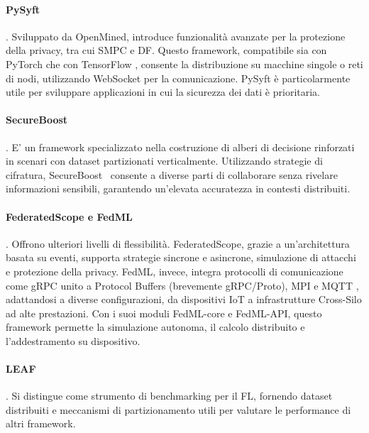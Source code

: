 \documentclass[a4paper, oneside, openright]{report}
\begin{document}
\paragraph{PySyft} \cite{pysyft}. Sviluppato da OpenMined, introduce funzionalità avanzate per la protezione della privacy, tra cui SMPC e DF. Questo framework, compatibile sia con PyTorch \cite{pytorch} che con TensorFlow \cite{tf}, consente la distribuzione su macchine singole o reti di nodi, utilizzando WebSocket per la comunicazione. PySyft è particolarmente utile per sviluppare applicazioni in cui la sicurezza dei dati è prioritaria.

\paragraph{SecureBoost} \cite{secure-boost}. E' un framework specializzato nella costruzione di alberi di decisione rinforzati in scenari con dataset partizionati verticalmente. Utilizzando strategie di cifratura, SecureBoost~\cite{secure-boost} consente a diverse parti di collaborare senza rivelare informazioni sensibili, garantendo un'elevata accuratezza in contesti distribuiti.


\paragraph{FederatedScope e FedML} \cite{federated-scope} \cite{fedml}. Offrono ulteriori livelli di flessibilità. FederatedScope, grazie a un'architettura basata su eventi, supporta strategie sincrone e asincrone, simulazione di attacchi e protezione della privacy. FedML, invece, integra protocolli di comunicazione come gRPC \cite{grpc} unito a Protocol Buffers \cite{proto-buff} (brevemente gRPC/Proto), MPI \cite{mpi} e MQTT \cite{mqtt}, adattandosi a diverse configurazioni, da dispositivi IoT a infrastrutture Cross-Silo ad alte prestazioni. Con i suoi moduli FedML-core e FedML-API, questo framework permette la simulazione autonoma, il calcolo distribuito e l'addestramento su dispositivo. 

\paragraph{LEAF} \cite{leaf}. Si distingue come strumento di benchmarking per il FL, fornendo dataset distribuiti e meccanismi di partizionamento utili per valutare le performance di altri framework.
\end{document}

